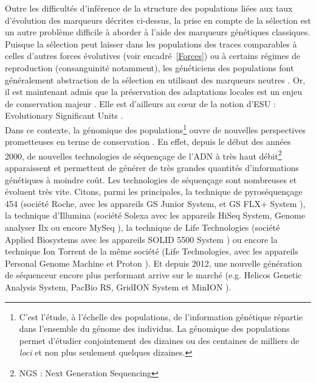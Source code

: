 \documentclass[a4paper,12pt,twoside]{article}\usepackage[]{graphicx}\usepackage[]{color}
\begin{document}
\begin {bibunit} [newbst]
Outre les difficultés d'inférence de la structure des populations liées aux taux d'évolution des marqueurs décrites ci-dessus, la prise en compte de la sélection est un autre problème difficile à aborder à l'aide des marqueurs génétiques classiques. Puisque la sélection peut laisser dans les populations des traces comparables à celles d'autres forces évolutives (voir encadré~\ref{Forces}) ou à certains régimes de reproduction (consanguinité notamment), les généticiens des populations font généralement abstraction de la sélection en utilisant des marqueurs neutres \citep{bazin2006population}. Or, il est maintenant admis que la préservation des adaptations locales est un enjeu de conservation majeur \citep{hallfors2015addressing}. Elle est d'ailleurs au c\oe ur de la notion d'ESU : Evolutionary Significant Units \citep{crandall2000}.\\

Dans ce contexte, la génomique des populations\footnote{C'est l'étude, à l'échelle des populations, de l'information génétique répartie dans l'ensemble du génome des individus. La génomique des populations permet d'étudier conjointement des dizaines ou des centaines de milliers de \emph{loci} et non plus seulement quelques dizaines.} ouvre de nouvelles perspectives prometteuses en terme de conservation \citep{shafer2015genomics, garner2015genomics, luikart2003power}. En effet, depuis le début des années 2000, de nouvelles technologies de séquençage de l'ADN à très haut débit\footnote{NGS : Next Generation Sequencing} apparaissent et permettent de générer de très grandes quantités d'informations génétiques à moindre coût. Les technologies de séquençage sont nombreuses et évoluent très vite. Citons, parmi les principales, la technique de pyroséquençage 454 (société Roche, avec les appareils GS Junior System, et GS FLX+ System \citep{GSFLX}), la technique d'Illumina (société Solexa avec les appareils HiSeq System, Genome analyser Ilx ou encore MySeq \citep{illumina}), la technique de Life Technologies (société Applied Biosystems avec les appareils SOLID 5500 System \citep{shokralla2012next}) ou encore la technique Ion Torrent de la même société (Life Technologies, avec les appareils Personal Genome Machine et Proton \citep{iontorrent}). Et depuis 2012, une nouvelle génération de séquenceur encore plus performant arrive sur le marché (e.g. Helicos Genetic Analysis System, PacBio RS, GridION System et MinION \citep{mikheyev2014first}). 


\end{bibunit}
\end{document}
